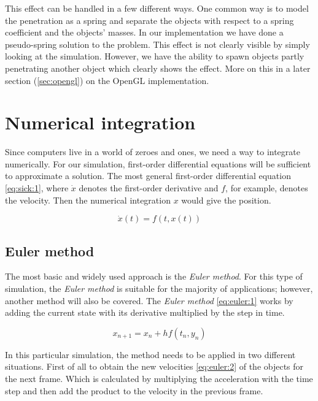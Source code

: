 \documentclass[a4paper,12pt]{report}
\begin{document}
This effect can be handled in a few different ways. One common way is to model the penetration as a spring and separate the objects with respect to a spring coefficient and the objects' masses. In our implementation we have done a pseudo-spring solution to the problem. This effect is not clearly visible by simply looking at the simulation. However, we have the ability to spawn objects partly penetrating another object which clearly shows the effect. More on this in a later section (\ref{sec:opengl}) on the OpenGL implementation.


\section{Numerical integration}

Since computers live in a world of zeroes and ones, we need a way to integrate numerically. For our simulation, first-order differential equations will be sufficient to approximate a solution. The most general first-order differential equation \eqref{eq:sick:1}, where $\dot{x}$ denotes the first-order derivative and $f$, for example, denotes the velocity. Then the numerical integration $x$ would give the position.

\begin{equation}
\dot{x}(t)=f(t,x(t))
\label{eq:sick:1}
\end{equation}

\subsection{Euler method}

The most basic and widely used approach is the \emph{Euler method}\cite{gdm}. For this type of simulation, the \emph{Euler method} is suitable for the majority of applications; however, another method will also be covered. The \emph{Euler method} \eqref{eq:euler:1} works by adding the current state with its derivative multiplied by the step in time.

\begin{equation}
x_{n+1}=x_{n}+hf(t_n, y_n)
\label{eq:euler:1}
\end{equation}

In this particular simulation, the method needs to be applied in two different situations. First of all to obtain the new velocities \eqref{eq:euler:2} of the objects for the next frame. Which is calculated by multiplying the acceleration with the time step and then add the product to the velocity in the previous frame.
\end{document}
